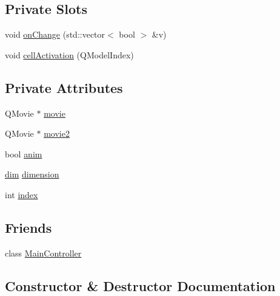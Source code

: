 \subsection*{Private Slots}
\begin{DoxyCompactItemize}
\item 
void \mbox{\hyperlink{class_matrix_controller_a0f75c93c52b1fb1b67af9f9220bfeb22}{on\+Change}} (std\+::vector$<$ bool $>$ \&v)
\item 
void \mbox{\hyperlink{class_matrix_controller_a5cd29184a9f7e7e02a5c3b2baa993aba}{cell\+Activation}} (Q\+Model\+Index)
\end{DoxyCompactItemize}
\subsection*{Private Attributes}
\begin{DoxyCompactItemize}
\item 
Q\+Movie $\ast$ \mbox{\hyperlink{class_matrix_controller_a588c0ffadd7ef176e46d84aaceabd845}{movie}}
\item 
Q\+Movie $\ast$ \mbox{\hyperlink{class_matrix_controller_a61c645ae410eb248913174b116d4f6dd}{movie2}}
\item 
bool \mbox{\hyperlink{class_matrix_controller_a905e5a4996b575460f54f5310ff71c42}{anim}}
\item 
\mbox{\hyperlink{automatamanager_8h_ae6fa959b9e8f9c638e0d82bf2c7dc5e7}{dim}} \mbox{\hyperlink{class_matrix_controller_af09a7f2162eb6086b2269e5d42f8cd5b}{dimension}}
\item 
int \mbox{\hyperlink{class_matrix_controller_a60e65c66b4d68572d47eb1d3b213260a}{index}}
\end{DoxyCompactItemize}
\subsection*{Friends}
\begin{DoxyCompactItemize}
\item 
class \mbox{\hyperlink{class_matrix_controller_a154f5ffe46dc74c6c94311b4cc3927ae}{Main\+Controller}}
\end{DoxyCompactItemize}


\subsection{Constructor \& Destructor Documentation}
\mbox{\label{class_matrix_controller_a9b3730013aece0bd3f8cbb28342d091a}} 
